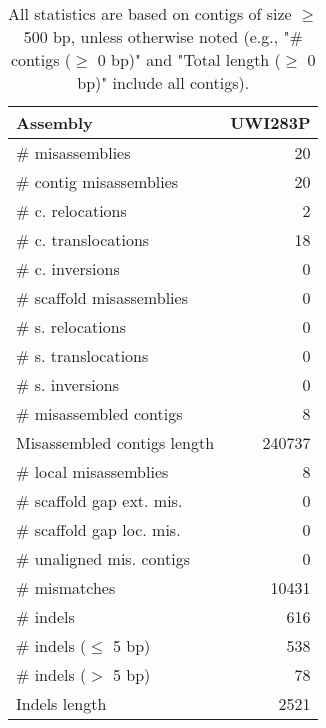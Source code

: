 \documentclass[12pt,a4paper]{article}
\begin{document}
\begin{table}[ht]
\begin{center}
\caption{All statistics are based on contigs of size $\geq$ 500 bp, unless otherwise noted (e.g., "\# contigs ($\geq$ 0 bp)" and "Total length ($\geq$ 0 bp)" include all contigs).}
\begin{tabular}{|l*{1}{|r}|}
\hline
Assembly & UWI283P \\ \hline
\# misassemblies & 20 \\ \hline
\hspace{2mm}\# contig misassemblies & 20 \\ \hline
\hspace{5mm}\# c. relocations & 2 \\ \hline
\hspace{5mm}\# c. translocations & 18 \\ \hline
\hspace{5mm}\# c. inversions & 0 \\ \hline
\hspace{2mm}\# scaffold misassemblies & 0 \\ \hline
\hspace{5mm}\# s. relocations & 0 \\ \hline
\hspace{5mm}\# s. translocations & 0 \\ \hline
\hspace{5mm}\# s. inversions & 0 \\ \hline
\# misassembled contigs & 8 \\ \hline
Misassembled contigs length & 240737 \\ \hline
\# local misassemblies & 8 \\ \hline
\# scaffold gap ext. mis. & 0 \\ \hline
\# scaffold gap loc. mis. & 0 \\ \hline
\# unaligned mis. contigs & 0 \\ \hline
\# mismatches & 10431 \\ \hline
\# indels & 616 \\ \hline
\hspace{5mm}\# indels ($\leq$ 5 bp) & 538 \\ \hline
\hspace{5mm}\# indels ($>$ 5 bp) & 78 \\ \hline
Indels length & 2521 \\ \hline
\end{tabular}
\end{center}
\end{table}
\end{document}
